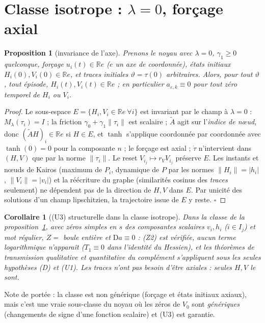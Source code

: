 \documentclass[11pt,a4paper]{article}
\newtheorem{proposition}[theoreme]{Proposition}
\newtheorem{corollaire}[theoreme]{Corollaire}
\theoremstyle{remark}
\newcommand{\R}{\mathbb R}
\newcommand{\vth}{\vartheta}
\newcommand{\D}{\mathrm D}
\begin{document}
\section{Classe isotrope : $\lambda=0$, forçage axial}\label{sec:iso}
\begin{proposition}[invariance de l'axe]\label{prop:iso}
Prenons le noyau avec $\lambda=0$, $\gamma_1\ge0$ quelconque, forçage $u_i(t)\in\R e$ ($e$ un axe de \emph{coordonnée}), états initiaux $H_i(0),V_i(0)\in\R e$, et traces initiales $\vth=\tau(0)$ \emph{arbitraires}. Alors, pour tout $\vth$, tout épisode, $H_i(t),V_i(t)\in\R e$ ; en particulier $a_{\varepsilon,k}\equiv0$ pour tout zéro temporel de $H_i$ ou $V_i$.
\end{proposition}
\begin{proof}
Le sous-espace $E=\{H_i,V_i\in\R e\ \forall i\}$ est invariant par le champ à $\lambda=0$ : $M_\lambda(\tau_i)=I$ ; la friction $\gamma_0+\gamma_1\lVert\tau_i\rVert$ est scalaire ; $\widetilde A$ agit sur l'\emph{indice de nœud}, donc $(\widetilde AH)_i\in\R e$ si $H\in E$, et $\tanh$ s'applique coordonnée par coordonnée avec $\tanh(0)=0$ pour la composante $n$ ; le forçage est axial ; $\dot\tau$ n'intervient dans $(H,V)$ que par la norme $\lVert\tau_i\rVert$. Le reset $V_{i_j}\mapsto r_VV_{i_j}$ préserve $E$. Les instants et nœuds de Kairos (maximum de $P_i$, dynamique de $P$ par les normes $\lVert H_i\rVert=\lvert h_i\rvert$, $\lVert V_i\rVert=\lvert v_i\rvert$) et la réécriture du graphe (similarités cosinus des \emph{traces} seulement) ne dépendent pas de la direction de $H,V$ dans $E$. Par unicité des solutions d'un champ lipschitzien, la trajectoire issue de $E$ y reste. $\square$
\end{proof}
\begin{corollaire}[(U3) structurelle dans la classe isotrope]\label{cor:iso}
Dans la classe de la proposition~\ref{prop:iso}, avec zéros simples en $s$ des composantes scalaires $v_i,h_i$ ($i\in I_j$) et mot régulier, $Z=$ boule entière et $\D a\equiv0$ : (Z2) est vérifiée, aucun terme logarithmique n'apparaît ($T_1\equiv0$ dans l'identité du Hessien), et les théorèmes de transmission qualitative et quantitative du complément s'appliquent sous les seules hypothèses (D) et (U1). Les traces n'ont pas besoin d'être axiales : seules $H,V$ le sont.
\end{corollaire}
Note de portée : la classe est non générique (forçage et états initiaux axiaux), mais c'est une vraie sous-classe du noyau où les zéros de $V_0$ sont \emph{génériques} (changements de signe d'une fonction scalaire) et (U3) est garantie.
\end{document}
